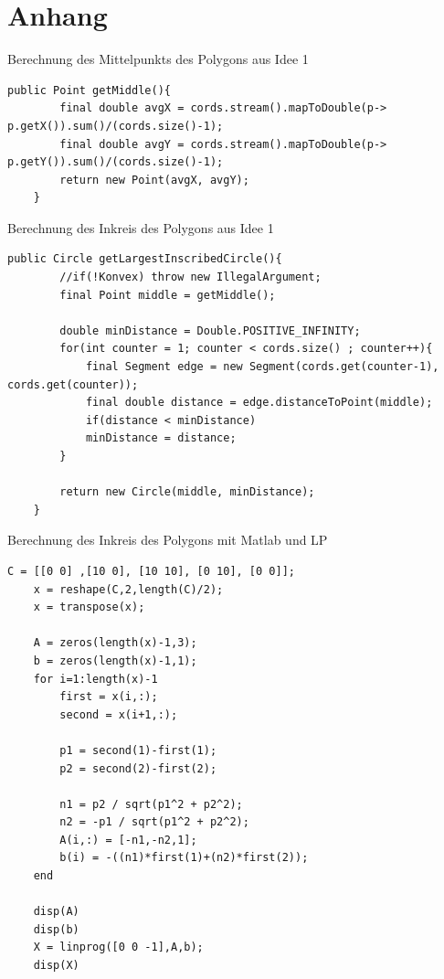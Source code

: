 \documentclass[conference]{IEEEtran}
\begin{document}
	\section{Anhang}
	Berechnung des Mittelpunkts des Polygons aus Idee 1
	\begin{lstlisting}[basicstyle=\tiny]
	public Point getMiddle(){
		final double avgX = cords.stream().mapToDouble(p-> p.getX()).sum()/(cords.size()-1);
		final double avgY = cords.stream().mapToDouble(p-> p.getY()).sum()/(cords.size()-1);
		return new Point(avgX, avgY);
	}
	\end{lstlisting}
	Berechnung des Inkreis des Polygons aus Idee 1
	\begin{lstlisting}[basicstyle=\tiny]
	public Circle getLargestInscribedCircle(){
		//if(!Konvex) throw new IllegalArgument;
		final Point middle = getMiddle();
		
		double minDistance = Double.POSITIVE_INFINITY;
		for(int counter = 1; counter < cords.size() ; counter++){
			final Segment edge = new Segment(cords.get(counter-1), cords.get(counter));
			final double distance = edge.distanceToPoint(middle);
			if(distance < minDistance)
			minDistance = distance;
		}
		
		return new Circle(middle, minDistance);
	}
	\end{lstlisting} 
 	Berechnung des Inkreis des Polygons mit Matlab und LP
	\begin{lstlisting}[basicstyle=\tiny]
	C = [[0 0] ,[10 0], [10 10], [0 10], [0 0]];
	x = reshape(C,2,length(C)/2);
	x = transpose(x);
	
	A = zeros(length(x)-1,3);
	b = zeros(length(x)-1,1);
	for i=1:length(x)-1
		first = x(i,:);
		second = x(i+1,:);
		
		p1 = second(1)-first(1);
		p2 = second(2)-first(2);
		
		n1 = p2 / sqrt(p1^2 + p2^2);
		n2 = -p1 / sqrt(p1^2 + p2^2);
		A(i,:) = [-n1,-n2,1];
		b(i) = -((n1)*first(1)+(n2)*first(2));
	end
	
	disp(A)
	disp(b)
	X = linprog([0 0 -1],A,b);
	disp(X)
	\end{lstlisting}  
	
\end{document}
